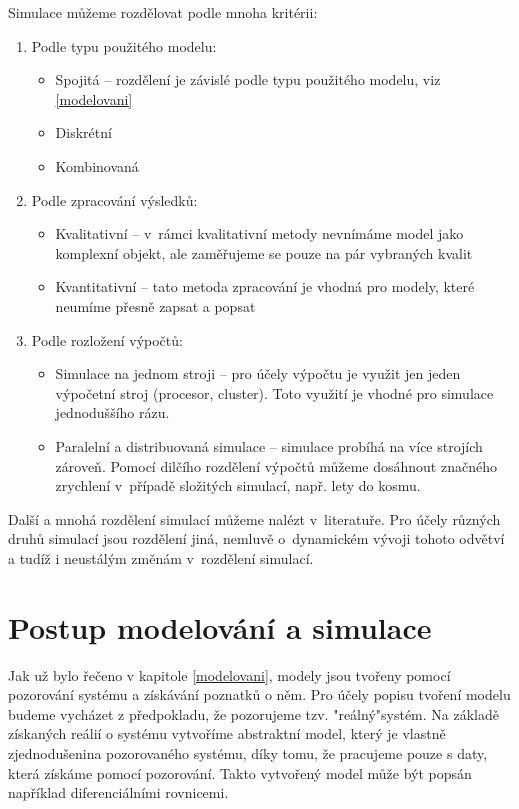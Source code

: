Simulace můžeme rozdělovat podle mnoha kritérii:
\begin{enumerate}
    \item Podle typu použitého modelu:
        \begin{itemize}
            \item Spojitá -- rozdělení je závislé podle typu použitého modelu, viz \ref{modelovani}
            \item Diskrétní
            \item Kombinovaná
        \end{itemize}
    \item Podle zpracování výsledků:
        \begin{itemize}
            \item Kvalitativní -- v~rámci kvalitativní metody nevnímáme model jako komplexní objekt, ale zaměřujeme se pouze na pár vybraných kvalit
            \item Kvantitativní -- tato metoda zpracování je vhodná pro modely, které neumíme přesně zapsat a popsat
        \end{itemize}
    \item Podle rozložení výpočtů:
        \begin{itemize}
            \item Simulace na jednom stroji -- pro účely výpočtu je využit jen jeden výpočetní stroj (procesor, cluster). Toto využití je vhodné pro simulace jednoduššího rázu.
            \item Paralelní a distribuovaná simulace -- simulace probíhá na více strojích zároveň. Pomocí dilčího rozdělení výpočtů můžeme dosáhnout značného zrychlení v~případě složitých simulací, např. lety do kosmu.
        \end{itemize}
\end{enumerate}
Další a mnohá rozdělení simulací můžeme nalézt v~literatuře. Pro účely různých druhů simulací jsou rozdělení jiná, nemluvě o~dynamickém vývoji tohoto odvětví a tudíž i neustálým změnám v~rozdělení simulací.

\section{Postup modelování a simulace}
Jak už bylo řečeno v kapitole \ref{modelovani}, modely jsou tvořeny pomocí pozorování systému a získávání poznatků o něm. Pro účely popisu tvoření modelu budeme vycházet z předpokladu, že pozorujeme tzv. "reálný"\space systém. Na základě získaných reálií o systému vytvoříme abstraktní model, který je vlastně zjednodušenina pozorovaného systému, díky tomu, že pracujeme pouze s daty, která získáme pomocí pozorování. Takto vytvořený model může být popsán například diferenciálními rovnicemi.

